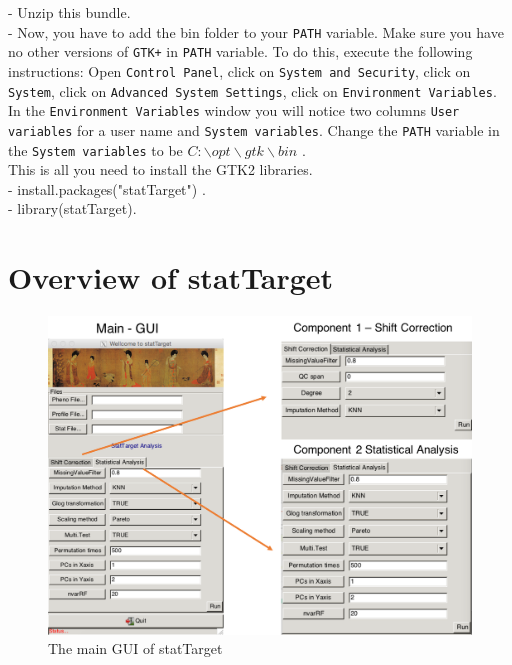 \documentclass[english]{article}
\begin{document}
 - Unzip this bundle.\\

 - Now, you have to add the bin folder to your \texttt{PATH} variable. Make sure you have no other versions of \texttt{GTK+} in \texttt{PATH} variable. To do this, execute the following instructions:
Open \texttt{Control Panel}, click on \texttt{System and Security}, click on \texttt{System}, click on \texttt{Advanced System Settings}, click on \texttt{Environment Variables}. In the \texttt{Environment Variables} window you will notice two columns \texttt{User variables} for a user name and \texttt{System variables}. Change the \texttt{PATH} variable in the \texttt{System variables} to be \texttt{$C:\backslash opt \backslash gtk \backslash bin$} .\\

This is all you need to install the GTK2 libraries.\\

 - install.packages("statTarget") .\\

 - library(statTarget).



\section[Overview of statTarget]{Overview of statTarget}

%
\begin{figure}

\includegraphics[scale=0.5]{main_gui}

\caption{\label{fig:main_gui}The main GUI of statTarget}

\end{figure}
\end{document}
